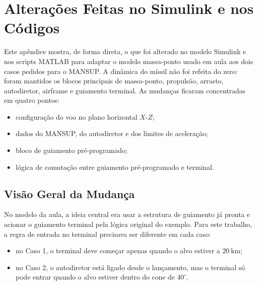 \appendix
\section{Altera\c{c}\~oes Feitas no Simulink e nos C\'odigos}

Este ap\^endice mostra, de forma direta, o que foi alterado no modelo Simulink e nos scripts MATLAB para adaptar o modelo massa-ponto usado em aula aos dois casos pedidos para o MANSUP. A din\^amica do m\'issil n\~ao foi refeita do zero: foram mantidos os blocos principais de massa-ponto, propuls\~ao, arrasto, autodiretor, airframe e guiamento terminal. As mudan\c{c}as ficaram concentradas em quatro pontos:

\begin{itemize}
    \item configura\c{c}\~ao do voo no plano horizontal \(X\)-\(Z\);
    \item dados do MANSUP, do autodiretor e dos limites de acelera\c{c}\~ao;
    \item bloco de guiamento pr\'e-programado;
    \item l\'ogica de comuta\c{c}\~ao entre guiamento pr\'e-programado e terminal.
\end{itemize}

\subsection{Vis\~ao Geral da Mudan\c{c}a}

No modelo da aula, a ideia central era usar a estrutura de guiamento j\'a pronta e acionar o guiamento terminal pela l\'ogica original do exemplo. Para este trabalho, a regra de entrada no terminal precisava ser diferente em cada caso:

\begin{itemize}
    \item no Caso 1, o terminal deve come\c{c}ar apenas quando o alvo estiver a \(20~\text{km}\);
    \item no Caso 2, o autodiretor est\'a ligado desde o lan\c{c}amento, mas o terminal s\'o pode entrar quando o alvo estiver dentro do cone de \(40^\circ\).
\end{itemize}


